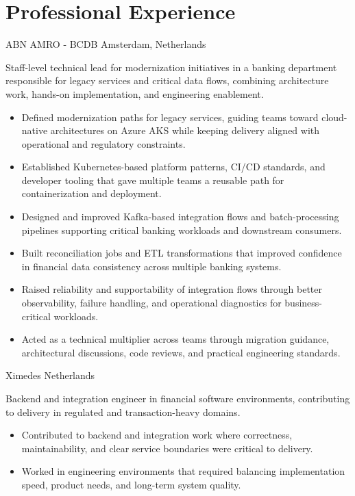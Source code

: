 \documentclass[10pt,a4paper,sans]{moderncv}
\begin{document}
\section{Professional Experience}
{ABN AMRO - BCDB}
{Amsterdam, Netherlands}
{}{
Staff-level technical lead for modernization initiatives in a banking department responsible for legacy services and critical data flows, combining architecture work, hands-on implementation, and engineering enablement.
\begin{itemize}
 \item Defined modernization paths for legacy services, guiding teams toward cloud-native architectures on Azure AKS while keeping delivery aligned with operational and regulatory constraints.
 \item Established Kubernetes-based platform patterns, CI/CD standards, and developer tooling that gave multiple teams a reusable path for containerization and deployment.
 \item Designed and improved Kafka-based integration flows and batch-processing pipelines supporting critical banking workloads and downstream consumers.
 \item Built reconciliation jobs and ETL transformations that improved confidence in financial data consistency across multiple banking systems.
 \item Raised reliability and supportability of integration flows through better observability, failure handling, and operational diagnostics for business-critical workloads.
 \item Acted as a technical multiplier across teams through migration guidance, architectural discussions, code reviews, and practical engineering standards.
\end{itemize}
}

{Ximedes}
{Netherlands}
{}{
Backend and integration engineer in financial software environments, contributing to delivery in regulated and transaction-heavy domains.
\begin{itemize}
 \item Contributed to backend and integration work where correctness, maintainability, and clear service boundaries were critical to delivery.
 \item Worked in engineering environments that required balancing implementation speed, product needs, and long-term system quality.
\end{itemize}
}
\end{document}
